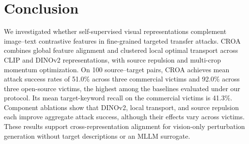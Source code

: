 \documentclass{article}
\newcommand{\ours}{\textsc{CROA}}
\begin{document}
\section{Conclusion}
We investigated whether self-supervised visual representations complement image--text contrastive features in fine-grained targeted transfer attacks. \ours{} combines global feature alignment and clustered local optimal transport across CLIP and DINOv2 representations, with source repulsion and multi-crop momentum optimization. On 100 source--target pairs, \ours{} achieves mean attack success rates of 51.0\% across three commercial victims and 92.0\% across three open-source victims, the highest among the baselines evaluated under our protocol. Its mean target-keyword recall on the commercial victims is 41.3\%. Component ablations show that DINOv2, local transport, and source repulsion each improve aggregate attack success, although their effects vary across victims. These results support cross-representation alignment for vision-only perturbation generation without target descriptions or an MLLM surrogate.
\end{document}
